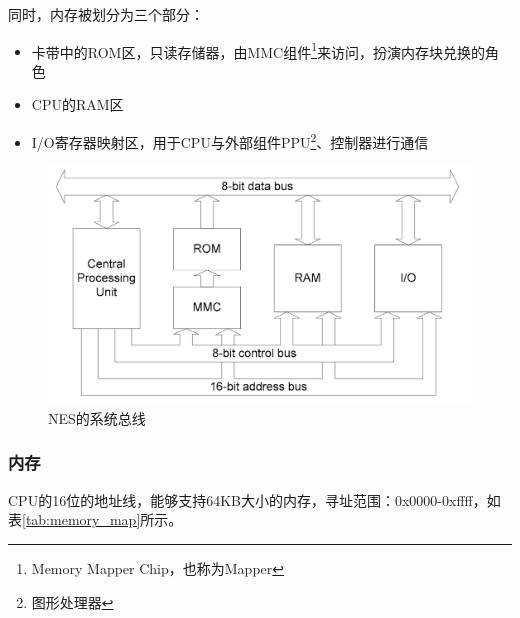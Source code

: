 \documentclass[a4paper]{ltxdoc}
\begin{document}
{同时，内存被划分为三个部分：
\begin{itemize}
	\item 卡带中的ROM区，只读存储器，由MMC组件\footnote{Memory Mapper Chip，也称为Mapper}来访问，扮演内存块兑换的角色
	\item CPU的RAM区
	\item I/O寄存器映射区，用于CPU与外部组件PPU\footnote{图形处理器}、控制器进行通信
\end{itemize}

\begin{figure}[h]
	\centering
	\includegraphics[width=\textwidth]{images/system_bus.png}
	\caption{NES的系统总线}
	\label{fig:system_bus}
\end{figure}

\subsubsection{内存}
CPU的16位的地址线，能够支持64KB大小的内存，寻址范围：0x0000-0xffff，如表\ref{tab:memory_map}所示。

}
\end{document}
